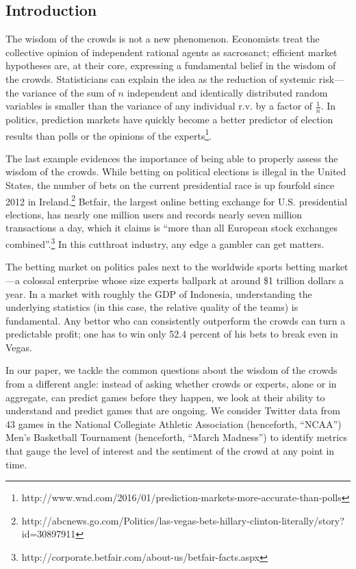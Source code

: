 \documentclass[12pt]{article}
\begin{document}
\newpage

\tableofcontents
\newpage
\begin{doublespacing}

\section{Introduction}

The wisdom of the crowds is not a new phenomenon. Economists treat the collective opinion of independent rational agents as sacrosanct; efficient market hypotheses are, at their core, expressing a fundamental belief in the wisdom of the crowds. Statisticians can explain the idea as the reduction of systemic risk---the variance of the sum of $n$ independent and identically distributed random variables is smaller than the variance of any individual r.v. by a factor of $\frac{1}{n}$. In politics, prediction markets have quickly become a better predictor of election results than polls or the opinions of the experts\footnote{http://www.wnd.com/2016/01/prediction-markets-more-accurate-than-polls}.

The last example evidences the importance of being able to properly assess the wisdom of the crowds. While betting on political elections is illegal in the United States, the number of bets on the current presidential race is up fourfold since 2012 in Ireland.\footnote{http://abcnews.go.com/Politics/las-vegas-bets-hillary-clinton-literally/story?id=30897911} Betfair, the largest online betting exchange for U.S. presidential elections, has nearly one million users and records nearly seven million transactions a day, which it claims is ``more than all European stock exchanges combined''.\footnote{http://corporate.betfair.com/about-us/betfair-facts.aspx} In this cutthroat industry, any edge a gambler can get matters. 

The betting market on politics pales next to the worldwide sports betting market---a colossal enterprise whose size experts ballpark at around \$1 trillion dollars a year. In a market with roughly the GDP of Indonesia, understanding the underlying statistics (in this case, the relative quality of the teams) is fundamental. Any bettor who can consistently outperform the crowds can turn a predictable profit; one has to win only 52.4 percent of his bets to break even in Vegas. 

In our paper, we tackle the common questions about the wisdom of the crowds from a different angle: instead of asking whether crowds or experts, alone or in aggregate, can predict games before they happen, we look at their ability to understand and predict games that are ongoing. We consider Twitter data from 43 games in the National Collegiate Athletic Association (henceforth, ``NCAA'') Men's Basketball Tournament (henceforth, ``March Madness'') to identify metrics that gauge the level of interest and the sentiment of the crowd at any point in time. 


\end{doublespacing}
\end{document}

